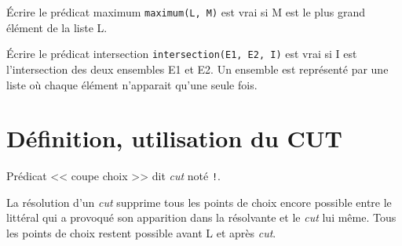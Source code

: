 \documentclass[12pt,a4paper,openany]{book}
\begin{document}
Écrire le prédicat maximum \texttt{maximum(L, M)} est vrai si M est le plus grand élément de la liste L.


Écrire le prédicat intersection \texttt{intersection(E1, E2, I)} est vrai si I est l'intersection des deux ensembles E1 et E2. Un ensemble est
représenté par une liste où chaque élément n'apparait qu'une seule fois.


\section{Définition, utilisation du CUT}
Prédicat << coupe choix >> dit \textit{cut} noté \texttt{!}.
\begin{definition}
	La résolution d'un \textit{cut} supprime tous les points de choix encore possible entre le littéral qui a provoqué son apparition dans la résolvante
	et le \textit{cut} lui même. Tous les points de choix restent possible avant L et après \textit{cut}.
\end{definition}




\appendix
\lstlistoflistings
\end{document}
